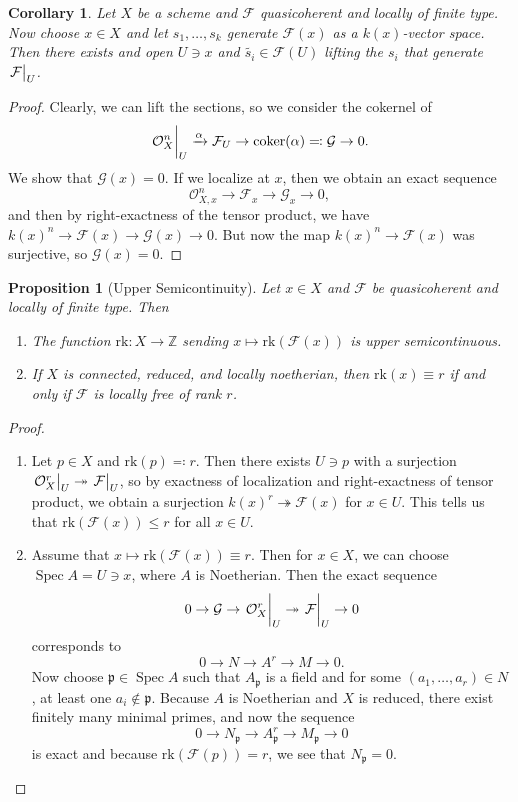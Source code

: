 \documentclass[leqno, openany]{memoir}
\newtheorem{cor}[thm]{Corollary}
\newtheorem{prop}[thm]{Proposition}
\theoremstyle{definition}
\theoremstyle{remark}
\theoremstyle{plain}
\theoremstyle{definition}
\theoremstyle{remark}
\newcommand{\Z}{\mathbb{Z}}
\newcommand{\mc}[1]{\mathcal{#1}}
\newcommand{\mf}[1]{\mathfrak{#1}}
\newcommand{\mr}[1]{\mathrm{#1}}
\newcommand{\wt}[1]{\widetilde{#1}}
\DeclareMathOperator{\Spec}{Spec}
\begin{document}
\begin{cor} Let $X$ be a scheme and $\mc{F}$ quasicoherent and locally of
    finite type. Now choose $x \in X$ and let $s_1, \ldots, s_k$ generate
    $\mc{F}(x)$ as a $k(x)$-vector space. Then there exists and open $U \ni x$
    and $\wt{s_i} \in \mc{F}(U)$ lifting the $s_i$ that generate
    $\eval{\mc{F}}_U$.  \end{cor}

\begin{proof} Clearly, we can lift the sections, so we consider the cokernel of
    \[ \eval{\mc{O}_X^n}_U \xrightarrow{\alpha} \mc{F}_U \to \mr{coker}(\alpha)
    \eqqcolon \mc{G} \to 0. \] We show that $\mc{G}(x) = 0$. If we localize at
    $x$, then we obtain an exact sequence \[ \mc{O}_{X,x}^n \to \mc{F}_x \to
    \mc{G}_x \to 0, \] and then by right-exactness of the tensor product, we
    have ${k(x)}^n \to \mc{F}(x) \to \mc{G}(x) \to 0$. But now the map
    ${k(x)}^n \to \mc{F}(x)$ was surjective, so $\mc{G}(x) = 0$.  \end{proof}

\begin{prop}[Upper Semicontinuity] Let $x \in X$ and $\mc{F}$ be quasicoherent
    and locally of finite type. Then \begin{enumerate} \item The function
        $\mr{rk} \colon X \to \Z$ sending $x \mapsto \mr{rk}(\mc{F}(x))$ is
        upper semicontinuous.  \item If $X$ is connected, reduced, and locally
noetherian, then $\mr{rk}(x) \equiv r$ if and only if $\mc{F}$ is locally free
of rank $r$.  \end{enumerate} \end{prop}

\begin{proof}\leavevmode \begin{enumerate} \item Let $p \in X$ and $\mr{rk}(p)
    \eqqcolon r$. Then there exists $U \ni p$ with a surjection
    $\eval{\mc{O}_X^r}_U \twoheadrightarrow \eval{\mc{F}}_U$, so by exactness
    of localization and right-exactness of tensor product, we obtain a
    surjection ${k(x)}^r \twoheadrightarrow \mc{F}(x)$ for $x \in U$. This
    tells us that $\mr{rk}(\mc{F}(x)) \leq r$ for all $x \in U$.  \item Assume
    that $x \mapsto \mr{rk}(\mc{F}(x)) \equiv r$. Then for $x \in X$, we can
    choose $\Spec A = U \ni x$, where $A$ is Noetherian. Then the exact
    sequence \[ 0 \to \mc{G} \to \eval{\mc{O}_X^r}_U \twoheadrightarrow
    \eval{\mc{F}}_U \to 0 \] corresponds to \[ 0 \to N \to A^r \to M \to 0. \]
    Now choose $\mf{p} \in \Spec A$ such that $A_{\mf{p}}$ is a field and for
    some $(a_1, \ldots, a_r) \in N$, at least one $a_i \notin \mf{p}$. Because
    $A$ is Noetherian and $X$ is reduced, there exist finitely many minimal
    primes, and now the sequence \[ 0 \to N_{\mf{p}} \to A_{\mf{p}}^r \to
M_{\mf{p}} \to 0 \] is exact and because $\mr{rk}(\mc{F}(p)) = r$, we see that
$N_{\mf{p}} = 0$. \qedhere \end{enumerate} \end{proof}
\end{document}
